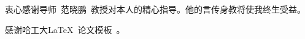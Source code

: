 \begin{acknowledgements}
衷心感谢导师~范晓鹏~教授对本人的精心指导。他的言传身教将使我终生受益。

感谢哈工大\LaTeX\ 论文模板\hithesis\ 。

\end{acknowledgements}
